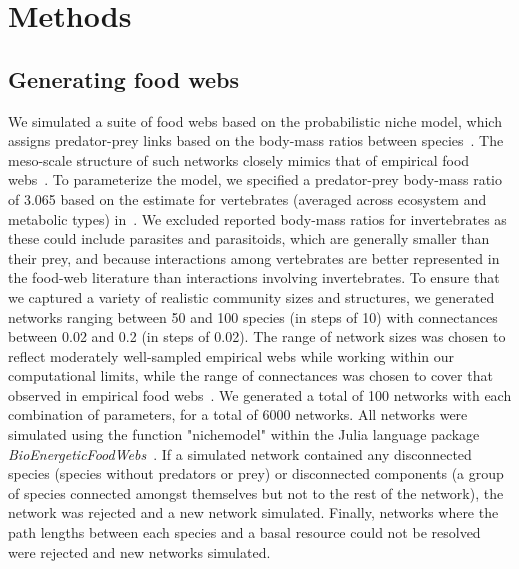 \documentclass[12pt]{article}
\begin{document}
\section{Methods}

  \subsection*{Generating food webs}

    We simulated a suite of food webs based on the probabilistic niche model, which assigns predator-prey links based on the body-mass ratios between species~\citep{Williams2000,Delmas2017}. The meso-scale structure of such networks closely mimics that of empirical food webs~\citep{Stouffer2007}. To parameterize the model, we specified a predator-prey body-mass ratio of 3.065 based on the estimate for vertebrates (averaged across ecosystem and metabolic types) in~\citet{Brose2006}. We excluded reported body-mass ratios for invertebrates as these could include parasites and parasitoids, which are generally smaller than their prey, and because interactions among vertebrates are better represented in the food-web literature than interactions involving invertebrates. To ensure that we captured a variety of realistic community sizes and structures, we generated networks ranging between 50 and 100 species (in steps of 10) with connectances between 0.02 and 0.2 (in steps of 0.02). The range of network sizes was chosen to reflect moderately well-sampled empirical webs while working within our computational limits, while the range of connectances was chosen to cover that observed in empirical food webs~\citep{}. We generated a total of 100 networks with each combination of parameters, for a total of 6000 networks. All networks were simulated using the function "nichemodel" within the Julia language package \emph{BioEnergeticFoodWebs}~\citep{bioenergeticfw,Delmas2017}. If a simulated network contained any disconnected species (species without predators or prey) or disconnected components (a group of species connected amongst themselves but not to the rest of the network), the network was rejected and a new network simulated. Finally, networks where the path lengths between each species and a basal resource could not be resolved were rejected and new networks simulated.
\end{document}
